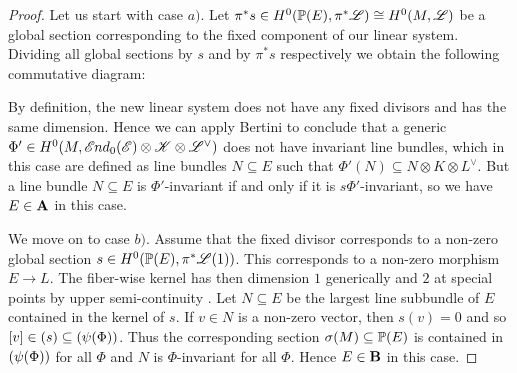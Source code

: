 \documentclass[A4paper, 12pt, british, reqno]{amsart}
\let\div\relax
\DeclareMathOperator{\div}{div}
\newcommand{\ot}{\otimes}
\newcommand{\dual}{^{\vee}}
\newcommand{\1}{\mathbbm{1}}
\begin{document}
\begin{lm}
\begin{proof}
	\color{gray}
	Let us start with case $a)$.
	Let $\pi^{*}s\in H^{0}(\P(E),\pi^{*}\L)\cong H^{0}(M,\L)$ be a global section corresponding to the fixed component of our linear system.
	Dividing all global sections by $s$ and by $\pi^{*}s$ respectively we obtain the following commutative diagram:
	\begin{center}
	\end{center}
	By definition, the new linear system does not have any fixed divisors and has the same dimension.
	Hence we can apply Bertini to conclude that a generic $\Phi'\in H^{0}(M,\sEnd_{0}(\E)\ot \sK\ot \L\dual)$ does not have invariant line bundles, which in this case are defined as line bundles $N\subseteq E$ such that $\Phi'(N)\subseteq N\ot K\ot L\dual$.
	But a line bundle $N\subseteq E$ is $\Phi'$-invariant if and only if it is $s\Phi'$-invariant, so we have $E\in \bfA$ in this case.

	We move on to case $b)$.
	Assume that the fixed divisor corresponds to a non-zero global section $s\in H^{0}(\P(E),\pi^{*}\L(1))$.
	This corresponds to a non-zero morphism $E\to L$.
	The fiber-wise kernel has then dimension $1$ generically and $2$ at special points by upper semi-continuity \cite[Proposition 1.3.2]{ati89}.
	Let $N\subseteq E$ be the largest line subbundle of $E$ contained in the kernel of $s$.
	If $v\in N$ is a non-zero vector, then $s(v)=0$ and so $[v]\in \div(s)\subseteq \div(\psi(\Phi))$.
	Thus the corresponding section $\sigma(M)\subseteq \P(E)$ is contained in $\div(\psi(\Phi))$ for all $\Phi$ and $N$ is $\Phi$-invariant for all $\Phi$.
	Hence $E\in \bfB$ in this case.


\end{proof}
\end{lm}
\end{document}
